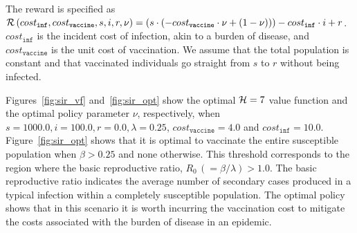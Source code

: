 The reward is specified as {\footnotesize $ \mathcal{R}\left(cost_{\mathtt{inf}}, cost_{\mathtt{vaccine}}, s, i, r, \nu \right) = (s \cdot (-cost_{\mathtt{vaccine}} \cdot \nu + (1 - \nu))) - cost_{\mathtt{inf}} \cdot i + r$}. {\footnotesize $ cost_{\mathtt{inf}} $} is the incident cost of infection, akin to a burden of disease, and {\footnotesize $ cost_{\mathtt{vaccine}} $} is the unit cost of vaccination. We assume that the total population is constant and that vaccinated individuals go straight from {\footnotesize $ s $} to {\footnotesize $ r $} without being infected. 


Figures~\ref{fig:sir_vf} and~\ref{fig:sir_opt} show the optimal {\footnotesize $ \mathcal{H} = 7 $} value function and the optimal policy parameter {\footnotesize $ \nu $}, respectively, when {\footnotesize $ s = 1000.0, i = 100.0, r = 0.0, \lambda = 0.25 $}, {\footnotesize $ cost_{\mathtt{vaccine}} = 4.0$} and {\footnotesize $ cost_{\mathtt{inf}} = 10.0 $}. Figure~\ref{fig:sir_opt} shows that it is optimal to vaccinate the entire susceptible population when {\footnotesize $ \beta > 0.25 $} and none otherwise. This threshold corresponds to the region where the  basic reproductive ratio, {\footnotesize $ R_0 \,(= \beta/\lambda) > 1.0$}. The basic reproductive ratio indicates the average number of secondary cases produced in a typical infection within a completely susceptible population. The optimal policy shows that in this scenario it is worth incurring the vaccination cost to mitigate the costs associated with the burden of disease in an epidemic.

